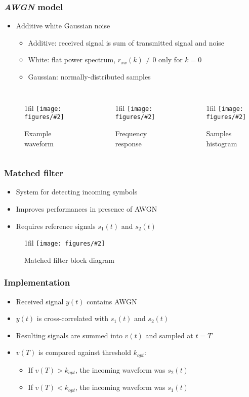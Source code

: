 \documentclass{beamer}
\makeatletter
\newcommand*{\centerfloat}{%
  \parindent \z@
  \leftskip \z@ \@plus 1fil \@minus \textwidth
  \rightskip\leftskip
  \parfillskip \z@skip}
\newcommand{\fig}[3]{
  \begin{figure}[H]
  \centerfloat
    \texttt{[image: figures/\#2]}
	\caption{#3}
  \end{figure}
}
\makeatother
\begin{document}
\begin{frame}
	\frametitle{\emph{AWGN} model}
	\begin{itemize}
		\item Additive white Gaussian noise
		\begin{itemize}
			\item Additive: received signal is sum of transmitted signal and noise
			\item White: flat power spectrum, $r_{xx}(k) \neq 0$ only for $k = 0$
			\item Gaussian: normally-distributed samples
		\end{itemize}
	\end{itemize}
	\begin{columns}
			\fig{2.75cm}{awgn_n.png}{Example waveform}
			\fig{2.75cm}{awgn_f.png}{Frequency response}
			\fig{2.75cm}{awgn_h.png}{Samples histogram}
	\end{columns}
\end{frame}

\begin{frame}
	\frametitle{Matched filter}
	\begin{itemize}
		\item System for detecting incoming symbols
		\item Improves performances in presence of AWGN
		\item Requires reference signals $s_1(t)$ and $s_2(t)$
	\end{itemize}
	\fig{4cm}{mf_block.png}{Matched filter block diagram}
\end{frame}

\begin{frame}
	\frametitle{Implementation}
	\begin{itemize}
		\item Received signal $y(t)$ contains AWGN
		\item $y(t)$ is cross-correlated with $s_1(t)$ and $s_2(t)$
		\item Resulting signals are summed into $v(t)$ and sampled at $t = T$
		\item $v(T)$ is compared against threshold $k_{opt}$:
		\begin{itemize}
			\item If $v(T) > k_{opt}$, the incoming waveform was $s_2(t)$
			\item If $v(T) < k_{opt}$, the incoming waveform was $s_1(t)$
		\end{itemize}
	\end{itemize}
\end{frame}
\end{document}
